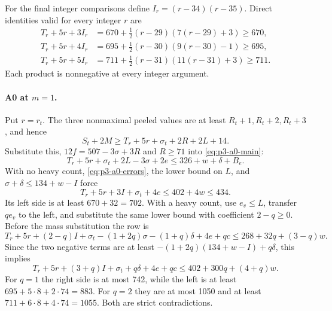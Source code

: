 \documentclass[11pt,letterpaper]{article}
\theoremstyle{definition}\newtheorem{definition}[theorem]{Definition}
\begin{document}
For the final integer comparisons define $I_r=(r-34)(r-35)$. Direct
identities valid for every integer $r$ are
\begin{equation}\label{eq:p3-a0-quadratics}
\begin{aligned}
T_r+5r+3I_r&=670+\tfrac12(r-29)(7(r-29)+3)\ge670,\\
T_r+5r+4I_r&=695+\tfrac12(r-30)(9(r-30)-1)\ge695,\\
T_r+5r+5I_r&=711+\tfrac12(r-31)(11(r-31)+3)\ge711.
\end{aligned}
\end{equation}
Each product is nonnegative at every integer argument.

\paragraph{A0 at $m=1$.}
Put $r=r_t$. The three nonmaximal peeled values are at least
$R_t+1,R_t+2,R_t+3$, and hence
\[
S_t+2M\ge T_r+5r+\sigma_t+2R+2L+14.
\]
Substitute this, $12f=507-3\sigma+3R$ and $R\ge71$ into
\eqref{eq:p3-a0-main}:
\[
T_r+5r+\sigma_t+2L-3\sigma+2e
\le326+w+\delta+B_e.
\]
With no heavy count, \eqref{eq:p3-a0-errors}, the lower bound on $L$,
and $\sigma+\delta\le134+w-I$ force
\[
T_r+5r+3I+\sigma_t+4e\le402+4w\le434.
\]
Its left side is at least $670+32=702$.
With a heavy count, use $e_v\le L$, transfer $qe_v$ to the left,
and substitute the same lower bound with coefficient $2-q\ge0$.
Before the mass substitution the row is
\[
T_r+5r+(2-q)I+\sigma_t-(1+2q)\sigma-(1+q)\delta+4e+qc
\le268+32q+(3-q)w.
\]
Since the two negative terms are at least
$-(1+2q)(134+w-I)+q\delta$, this implies
\begin{equation}\label{eq:p3-a0-m1-heavy}
T_r+5r+(3+q)I+\sigma_t+q\delta+4e+qc
\le402+300q+(4+q)w.
\end{equation}
For $q=1$ the right side is at most 742, while the left is at least
$695+5\cdot8+2\cdot74=883$. For $q=2$ they are at most 1050
and at least $711+6\cdot8+4\cdot74=1055$. Both are strict contradictions.
\end{document}
